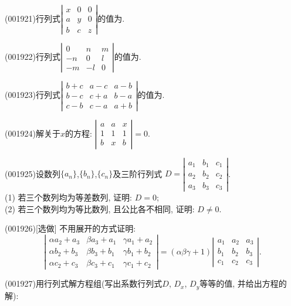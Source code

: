 \item (001921)行列式$\left|\begin{array}{ccc}x & 0 & 0\\a & y & 0\\b & c & z\end{array}\right|$的值为.
\item (001922)行列式$\left|\begin{array}{ccc}0 & n& m\\-n & 0 & l\\ -m & -l & 0\end{array}\right|$的值为.
\item (001923)行列式$\left|\begin{array}{ccc}b+c&a-c&a-b\\b-c&c+a&b-a\\c-b&c-a&a+b\end{array}\right|$的值为.
\item (001924)解关于$x$的方程: $\left|\begin{array}{ccc}a&a&x\\1&1&1\\b&x&b\end{array}\right|=0$.
\item (001925)设数列$\{a_n\}$,$\{b_n\}$,$\{c_n\}$及三阶行列式
$D=\left|\begin{array}{ccc}a_1 & b_1& c_1\\a_2& b_2&c_2\\a_3&b_3&c_3\end{array}\right|$.\\ 
(1) 若三个数列均为等差数列, 证明: $D=0$;\\ 
(2) 若三个数列均为等比数列, 且公比各不相同, 证明: $D\neq0$.
\item (001926)[选做]
不用展开的方式证明: $$\left|\begin{array}{ccc}\alpha a_2+a_3&\beta a_3+a_1 & \gamma a_1+a_2\\ \alpha b_2+b_3& \beta b_3+b_1 & \gamma b_1+b_2\\ \alpha c_2+c_3 & \beta c_3+c_1 & \gamma c_1+c_2 \end{array}\right|=(\alpha\beta\gamma+1)\left|\begin{array}{ccc}a_1 &a_2 & a_3\\b_1 & b_2 & b_3\\ c_1 & c_2 & c_3\end{array}\right|.$$
\item (001927)用行列式解方程组(写出系数行列式$D$, $D_x$, $D_y$等等的值, 并给出方程的解):\\ 
